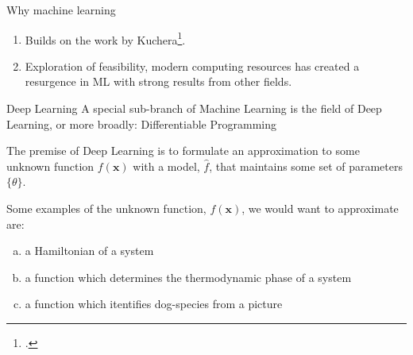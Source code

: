 \documentclass{beamer}
\begin{document}
\begin{frame}[t]{Why machine learning}
	\begin{enumerate}[I]
		\item Builds on the work by Kuchera\footcite{Kuchera2019}.
		\item Exploration of feasibility, modern computing resources
			has created a resurgence in ML with strong results from other fields.
	\end{enumerate}
\end{frame}

\begin{frame}[t]{Deep Learning}
	A special sub-branch of Machine Learning is the field of Deep Learning, or more broadly: Differentiable Programming

	The premise of Deep Learning is to formulate an approximation to some unknown function $f(\mathbf{x})$ with a model, $\hat{f}$, that maintains some set of parameters $\{\theta\}$. 

	Some examples of the unknown function, $f(\mathbf{x})$, we would want to approximate are:
	\begin{enumerate}[(a)]
		\item a Hamiltonian of a system 
		\item a function which determines the thermodynamic phase of a system
		\item a function which itentifies dog-species from a picture
	\end{enumerate}
\end{frame}

%
%
%
%
\end{document}
